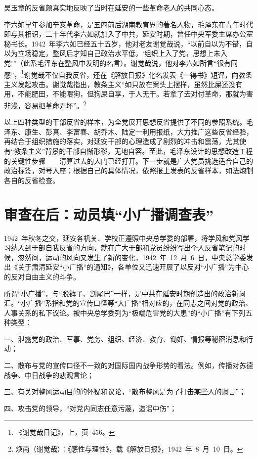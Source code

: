 吴玉章的反省颇真实地反映了当时在延安的一些革命老人的共同心态。

李六如早年参加辛亥革命，是五四前后湖南教育界的著名人物，毛泽东在青年时代即与其相识，二十年代李六如就加入了中共，延安时期，曾任中央军委主席办公室秘书长。1942~年李六如已经五十五岁，他对老友谢觉哉说，“以前自以为不错，自以为立场稳定，整风后才知自己政治水平低，‘组织上入了党，思想上未入党’”（此系毛泽东在整风中发明的名言）。谢觉哉说，他对李六如所言“很有同感”，\footnote{《谢觉哉日记》，上，页~456。}谢觉哉不仅自我反省，还在《解放日报》化名发表《一得书》短评，向教条主义发起攻击。谢觉哉指出，教条主义“如只放在案头上摆样，虽然比屎还没有用，不能肥田，不能喂狗，但狗屎自享，于人无干。若拿了去对付革命，那就为害非浅，容易把革命弄坏”。\footnote{焕南（谢觉哉）：《感性与理性》，载《解放日报》，1942~年~8~月~10~日。}

以上四种类型的干部反省的样本，为全党展开思想反省提供了不同的参照系统。毛泽东、康生、彭真、李富春、胡乔木、陆定一利用报纸，大力推广这些反省经验，再结合于组织措施的落实，对延安干部的心理造成了剧烈的冲击和震荡，尤其使有“教条主义”背景的干部自惭形秽，无地自容。至此，毛泽东设计的思想改造工程的关键性步骤——清算过去的大门已经打开。下一步就是广大党员挑选适合自己的政治标签，对号入座；根据自己的具体情况，依照报上发表的反省样本，如法炮制各自的反省检查。

\section{审查在后：动员填“小广播调查表”}

1942~年秋冬之交，延安各机关、学校正遵照中央总学委的部署，将学风和党风学习纳入到干部自我反省的方向，就在广大干部和党员纷纷写出个人反省笔记的时候，忽然间，运动的风向又发生了新的变化，1942~年~12~月~6~日，中央总学委发出《关于肃清延安“小广播”的通知》，各单位又迅速开展了以反对“小广播”为中心的反对自由主义的斗争。

所谓“小广播”，与“脱裤子、割尾巴”一样，是中共在延安时期创造出的政治新词汇。“小广播”系指和党的宣传口径等“大广播”相对应的，在同志之间对党的政治、人事关系的私下议论。被中央总学委列为“极端危害党的大患”的“小广播”有下列五种类型：

一、泄露党的政治、军事、党务、组织、经济、教育、锄奸、情报等秘密消息和行动；

二、散布与党的宣传口径不一致的对国际国内战争形势的看法。例如，传播对苏德战争、中日战争的悲观言论；

三、有关对整风运动目的的怀疑和议论，“散布整风是为了打击某些人的谰言”；

四、攻击党的领导，“对党内同志任意污蔑，造谣中伤”；


